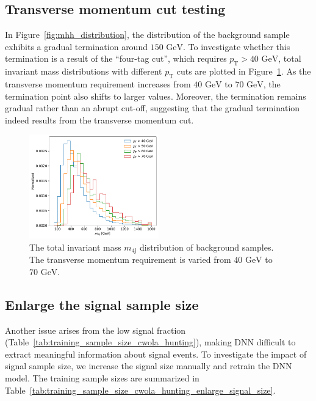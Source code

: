 \documentclass[12pt]{article}
\begin{document}
	\subsection{Transverse momentum cut testing}%
	\label{sub:pt_cut_testing}
		In Figure~\ref{fig:mhh_distribution}, the distribution of the background sample exhibits a gradual termination around $\text{150 GeV}$. To investigate whether this termination is a result of the ``four-tag cut'', which requires $p_{\text{T}} > \text{40 GeV}$, total invariant mass distributions with different $p_{\text{T}}$ cuts are plotted in Figure~\ref{fig:mhh_distribution_bkg_pt}. As the transverse momentum requirement increases from $\text{40 GeV}$ to $\text{70 GeV}$, the termination point also shifts to larger values. Moreover, the termination remains gradual rather than an abrupt cut-off, suggesting that the gradual termination indeed results from the transverse momentum cut.
		\begin{figure}[htpb]
			\centering
			\includegraphics[width=0.5\textwidth]{m4j_distribution_background_various_pt_cut.pdf}
			\caption{The total invariant mass $m_{\text{4j}}$ distribution of background samples. The transverse momentum requirement is varied from $\text{40 GeV}$ to $\text{70 GeV}$.}
			\label{fig:mhh_distribution_bkg_pt}
		\end{figure}
	\subsection{Enlarge the signal sample size}%
	\label{sub:enlarge_the_signal_sample_size}
		Another issue arises from the low signal fraction (Table~\ref{tab:training_sample_size_cwola_hunting}), making DNN difficult to extract meaningful information about signal events. To investigate the impact of signal sample size, we increase the signal size manually and retrain the DNN model. The training sample sizes are summarized in Table~\ref{tab:training_sample_size_cwola_hunting_enlarge_signal_size}.
\end{document}
